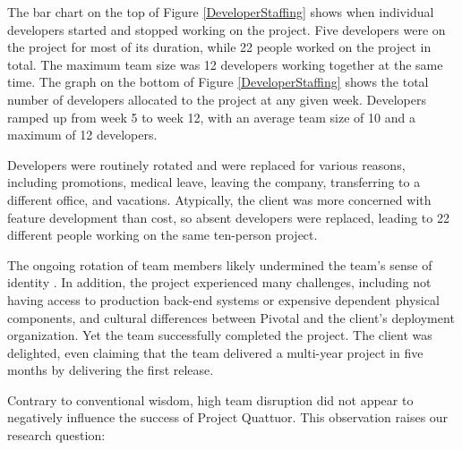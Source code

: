 The bar chart on the top of Figure \ref{DeveloperStaffing} shows when individual developers started and stopped working on the project. Five developers were on the project for most of its duration, while 22 people worked on the project in total. The maximum team size was 12 developers working together at the same time. The graph on the bottom of Figure \ref{DeveloperStaffing} shows the total number of developers allocated to the project at any given week. Developers ramped up from week 5 to week 12, with an average team size of 10 and a maximum of 12 developers.

Developers were routinely rotated and were replaced for various reasons, including promotions, medical leave, leaving the company, transferring to a different office, and vacations. Atypically, the client was more concerned with feature development than cost, so absent developers were replaced, leading to 22 different people working on the same ten-person project. 

The ongoing rotation of team members likely undermined the team's sense of identity \cite{TuckmanModel}. In addition, the project experienced many challenges, including not having access to production back-end systems or expensive dependent physical components, and cultural differences between Pivotal and the client's deployment organization. Yet the team successfully completed the project. The client was delighted, even claiming that the team delivered a multi-year project in five months by delivering the first release. 

Contrary to conventional wisdom, high team disruption did not appear to negatively influence the success of Project Quattuor. This observation raises our research question: 



